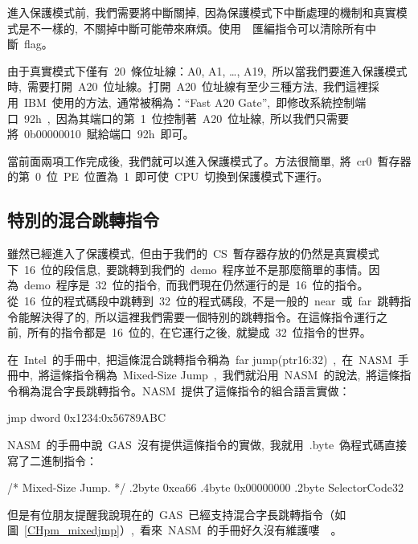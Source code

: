 進入保護模式前,~我們需要將中斷關掉,~因為保護模式下中斷處理的機制和真實模式是不一樣的,~不關掉中斷可能帶來麻煩。使用~~匯編指令可以清除所有中斷~flag。

由于真實模式下僅有~20~條位址線：A0, A1, \ldots, A19,~所以當我們要進入保護模式時,~需要打開~A20~位址線。打開~A20~位址線有至少三種方法,~我們這裡採用~IBM~使用的方法,~通常被稱為：“Fast A20 Gate”,~即修改系統控制端口~92h~,~因為其端口的第~1~位控制著~A20~位址線,~所以我們只需要將~0b00000010~賦給端口~92h~即可。

當前面兩項工作完成後,~我們就可以進入保護模式了。方法很簡單,~將~cr0~暫存器的第~0~位~PE~位置為~1~即可使~CPU~切換到保護模式下運行。

\label{CHpm_enablepm}

\subsection{特別的混合跳轉指令}

雖然已經進入了保護模式,~但由于我們的~CS~暫存器存放的仍然是真實模式下~16~位的段信息,~要跳轉到我們的~demo~程序並不是那麼簡單的事情。因為~demo~程序是~32~位的指令,~而我們現在仍然運行的是~16~位的指令。從~16~位的程式碼段中跳轉到~32~位的程式碼段,~不是一般的~near~或~far~跳轉指令能解決得了的,~所以這裡我們需要一個特別的跳轉指令。在這條指令運行之前,~所有的指令都是~16~位的,~在它運行之後,~就變成~32~位指令的世界。

在~Intel~的手冊中,~把這條混合跳轉指令稱為~far jump(ptr16:32)~,~在~NASM~手冊中,~將這條指令稱為~Mixed-Size Jump~,~我們就沿用~NASM~的說法,~將這條指令稱為混合字長跳轉指令。NASM~提供了這條指令的組合語言實做：
\begin{Command}
jmp dword 0x1234:0x56789ABC
\end{Command}
NASM~的手冊中說~GAS~沒有提供這條指令的實做,~我就用~.byte~偽程式碼直接寫了二進制指令：
\begin{Command}
/* Mixed-Size Jump. */
.2byte  0xea66
.4byte  0x00000000
.2byte  SelectorCode32
\end{Command}
但是有位朋友提醒我說現在的~GAS~已經支持混合字長跳轉指令（如圖~\ref{CHpm_mixedjmp}）,~看來~NASM~的手冊好久沒有維護嘍~\smiley~。

\label{CHpm_mixedjmp}

